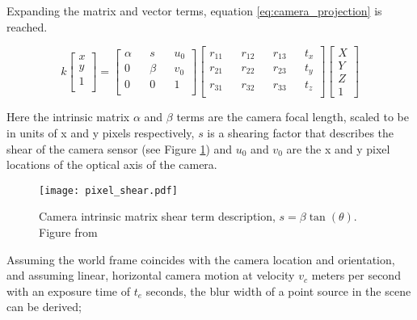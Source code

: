 Expanding the matrix and vector terms, equation \ref{eq:camera_projection} is reached.

\begin{equation}
\label{eq:camera_projection}
k
\begin{bmatrix}
x \\
y \\
1 \\
\end{bmatrix}
=
\begin{bmatrix}
\alpha && s && u_0 \\
0 && \beta && v_0 \\
0 && 0 && 1 \\
\end{bmatrix}
\begin{bmatrix}
r_{11} && r_{12} && r_{13} && t_x \\
r_{21} && r_{22} && r_{23} && t_y \\
r_{31} && r_{32} && r_{33} && t_z \\
\end{bmatrix}
\begin{bmatrix}
X \\
Y \\
Z \\
1
\end{bmatrix}
\end{equation}

Here the intrinsic matrix $\alpha$ and $\beta$ terms are the camera focal length, scaled to be in units of x and y pixels respectively, $s$ is a shearing factor that describes the shear of the camera sensor (see Figure \ref{fig:intrinsic_shear}) and $u_0$ and $v_0$ are the x and y pixel locations of the optical axis of the camera.

\begin{figure}[h]

\centering

\texttt{[image: pixel\_shear.pdf]}

\caption[Camera intrinsic matrix shear term]{Camera intrinsic matrix shear term description, $s = \beta\tan(\theta)$. Figure from \cite{pollefeys2002visual}}
\label{fig:intrinsic_shear}

\end{figure}

Assuming the world frame coincides with the camera location and orientation, and assuming linear, horizontal camera motion at velocity $v_c$ meters per second with an exposure time of $t_e$ seconds, the blur width of a point source in the scene can be derived;

